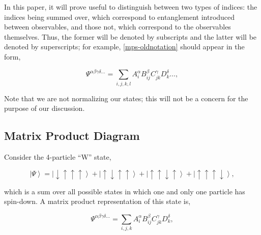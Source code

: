 \documentclass[12pt]{amsbook}
\theoremstyle{plain}
\theoremstyle{definition}
\theoremstyle{remark}
\newcommand{\ket}[1]{\left|#1\right>}
\begin{document}

In this paper, it will prove useful to distinguish between two types of indices:  the indices being summed over, which correspond to entanglement introduced between observables, and those not, which correspond to the observables themselves.  Thus, the former will be denoted by subscripts and the latter will be denoted by superscripts; for example, \eqref{mps-oldnotation} should appear in the form,

$$\Psi^{\alpha\beta\gamma\delta\dots} = \sum_{i,j,k,l} A_i^\alpha B_{ij}^\beta C_{jk}^\gamma D_{k}^\delta \dots,$$

Note that we are not normalizing our states;  this will not be a concern for the purpose of our discussion.
\subsection{Matrix Product Diagram}

Consider the 4-particle ``W'' state,

$$\ket{\Psi} = \ket{\downarrow\uparrow\uparrow\uparrow} + \ket{\uparrow\downarrow\uparrow\uparrow} + \ket{\uparrow\uparrow\downarrow\uparrow} + \ket{\uparrow\uparrow\uparrow\downarrow},$$

\noindent which is a sum over all possible states in which one and only one particle has spin-down.  A matrix product representation of this state is,

$$\Psi^{\alpha\beta\gamma\delta\dots} = \sum_{i,j,k} A_i^\alpha B_{ij}^\beta C_{jk}^\gamma D_{k}^\delta,$$
\end{document}
